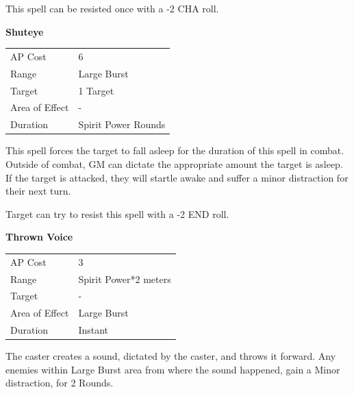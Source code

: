 \documentclass[11pt,a4paper,twocolumn]{book}
\begin{document}
This spell can be resisted once with a -2 CHA roll.

\bigskip
\noindent
\textbf{Shuteye}

\smallskip
{
	\begin{tabu} to 70mm{| X[l,4] | X[l,7] |}
		\hline
        AP Cost	      	& 6 						\\
        Range     		& Large Burst				\\
        Target      	& 1 Target		\\
        Area of Effect  & -  	 			\\
        Duration     	& Spirit Power Rounds		\\ \hline
	\end{tabu}
		
}
\smallskip

This spell forces the target to fall asleep for the duration of this spell in combat. Outside of combat, GM can dictate the appropriate amount the target is asleep. If the target is attacked, they will startle awake and suffer a minor distraction for their next turn. 

Target can try to resist this spell with a -2 END roll.

\bigskip
\noindent
\textbf{Thrown Voice}

\smallskip
{
	\begin{tabu} to 70mm{| X[l,4] | X[l,7] |}
		\hline
        AP Cost	      	& 3 						\\
        Range     		& Spirit Power*2 meters				\\
        Target      	& -		\\
        Area of Effect  & Large Burst  	 			\\
        Duration     	& Instant		\\ \hline
	\end{tabu}
		
}
\smallskip

The caster creates a sound, dictated by the caster, and throws it forward. Any enemies within Large Burst area from where the sound happened, gain a Minor distraction, for 2 Rounds.

\bigskip
\vfill
\pagebreak
\end{document}
